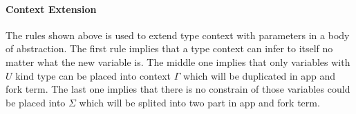 \documentclass[10pt]{article}
\newcommand{\wto}{\rightsquigarrow}
\theoremstyle{definition}\newtheorem*{theorem}{Theorem}
\theoremstyle{definition}\newtheorem*{definition}{Definition}
\theoremstyle{definition}\newtheorem*{lemma}{Lemma}
\begin{document}
    \paragraph{Context Extension}
    The rules shown above is used to extend type context with parameters in a body of abstraction. The first rule implies that a type context can infer to itself
    no matter what the new variable is. The middle one implies that only variables with $\mathit{U}$ kind type can be placed into context $\Gamma$ which will be
    duplicated in app and fork term. The last one implies that there is no constrain of those variables could be placed into $\Sigma$ which will be splited into
    two part in app and fork term.
\end{document}
